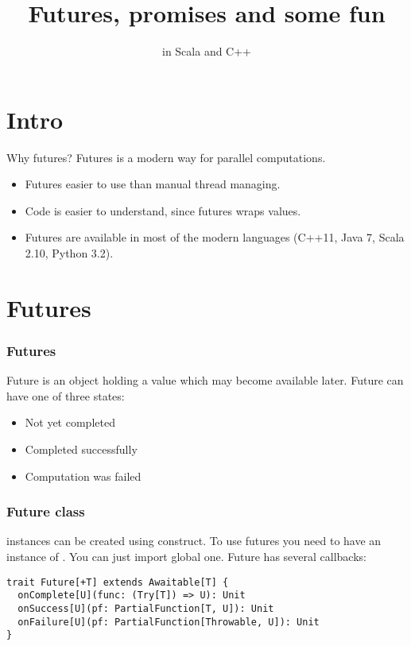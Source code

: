 

\usepackage{tikz}
\usepackage{tikz-uml}

\title{Futures, promises and some fun}
\subtitle{in Scala and C++}



\begin{frame}
    \titlepage
\end{frame}

\section {Intro}

\begin{frame}{Why futures?}
Futures is a modern way for parallel computations.
\begin{itemize}
\item Futures easier to use than manual thread managing.
\item Code is easier to understand, since futures wraps values.
\item Futures are available in most of the modern languages (C++11, Java 7, Scala 2.10, Python 3.2).
\end{itemize}
\end{frame}

\section{Futures}

\begin{frame}
\frametitle{Futures}
Future is an object holding a value which may become available later.  Future can have one of three states:
\begin{itemize}
\item Not yet completed
\item Completed successfully
\item Computation was failed
\end{itemize}
\end{frame}

\begin{frame}[fragile]
\frametitle{Future class}
 instances can be created using  construct.
To use futures you need to have an instance of . You can just import global one.
Future has several callbacks:
\begin{lstlisting}
trait Future[+T] extends Awaitable[T] {
  onComplete[U](func: (Try[T]) => U): Unit
  onSuccess[U](pf: PartialFunction[T, U]): Unit
  onFailure[U](pf: PartialFunction[Throwable, U]): Unit
}
\end{lstlisting}
\end{frame}

